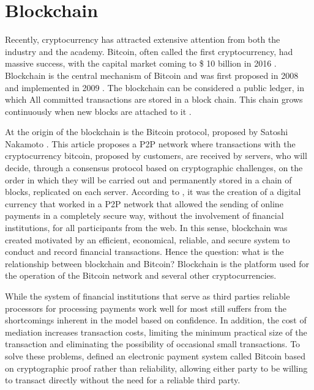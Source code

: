\section{Blockchain}\label{sec:blockchain}

Recently, cryptocurrency has attracted extensive attention from both the industry and the academy. Bitcoin, often called the first cryptocurrency, had massive success, with the capital market coming to \$ 10 billion in 2016 \cite{coindesk}. Blockchain is the central mechanism of Bitcoin and was first proposed in 2008 and implemented in 2009 \cite{nakamoto2008bitcoin}. The blockchain can be considered a  public ledger, in which All committed transactions are stored in a block chain. This chain grows continuously when new blocks are attached to it \cite{zheng2016blockchain}.

At the origin of the blockchain is the Bitcoin protocol, proposed by Satoshi Nakamoto \cite{nakamoto2008bitcoin}. This article proposes a  \ac{P2P} network where transactions with the cryptocurrency bitcoin, proposed by customers, are received by servers, who will decide, through a consensus protocol based on cryptographic challenges, on the order in which they will be carried out and permanently stored in a chain of blocks, replicated on each server. According to , it was the creation of a digital currency that worked in a P2P network that allowed the sending of online payments in a completely secure way, without the involvement of financial institutions, for all participants from the web. In this sense, blockchain was created motivated by an efficient, economical, reliable, and secure system to conduct and record financial transactions. Hence the question: what is the relationship between blockchain and Bitcoin? Blockchain is the platform used for the operation of the Bitcoin network and several other cryptocurrencies.

While the system of financial institutions that serve as third parties reliable processors for processing payments work well for most still suffers from the shortcomings inherent in the model based on confidence. In addition, the cost of mediation increases transaction costs, limiting the minimum practical size of the transaction and eliminating the possibility of occasional small transactions. To solve these problems, \cite{nakamoto2008bitcoin} defined an electronic payment system called Bitcoin based on cryptographic proof rather than reliability, allowing either party to be willing to transact directly without the need for a reliable third party.

